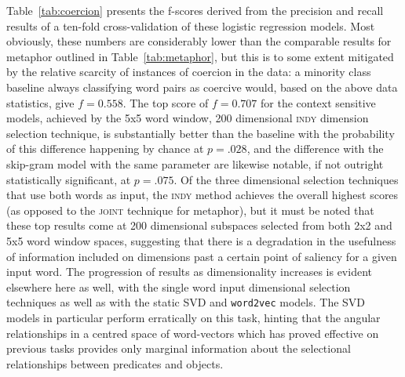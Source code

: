 Table~\ref{tab:coercion} presents the f-scores derived from the precision and recall results of a ten-fold cross-validation of these logistic regression models.  Most obviously, these numbers are considerably lower than the comparable results for metaphor outlined in Table~\ref{tab:metaphor}, but this is to some extent mitigated by the relative scarcity of instances of coercion in the data: a minority class baseline always classifying word pairs as coercive would, based on the above data statistics, give $f = 0.558$.  The top score of $f = 0.707$ for the context sensitive models, achieved by the 5x5 word window, 200 dimensional \textsc{indy} dimension selection technique, is substantially better than the baseline with the probability of this difference happening by chance at $p = .028$, and the difference with the skip-gram model with the same parameter are likewise notable, if not outright statistically significant, at $p = .075$.  Of the three dimensional selection techniques that use both words as input, the \textsc{indy} method achieves the overall highest scores (as opposed to the \textsc{joint} technique for metaphor), but it must be noted that these top results come at 200 dimensional subspaces selected from both 2x2 and 5x5 word window spaces, suggesting that there is a degradation in the usefulness of information included on dimensions past a certain point of saliency for a given input word.  The progression of results as dimensionality increases is evident elsewhere here as well, with the single word input dimensional selection techniques as well as with the static SVD and \texttt{word2vec} models.  The SVD models in particular perform erratically on this task, hinting that the angular relationships in a centred space of word-vectors which has proved effective on previous tasks provides only marginal information about the selectional relationships between predicates and objects.

